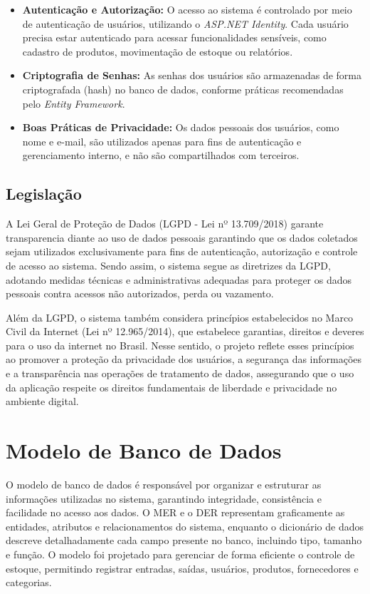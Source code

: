 \documentclass[
	12pt,				%
	openany,			%
	twoside,			%
	a4paper,			%
	english,			%
	brazil				%
	]{abntex2}
\begin{document}
\begin{itemize}
    \item \textbf{Autenticação e Autorização:} O acesso ao sistema é controlado por meio de autenticação de usuários, utilizando o \textit{ASP.NET Identity}. Cada usuário precisa estar autenticado para acessar funcionalidades sensíveis, como cadastro de produtos, movimentação de estoque ou relatórios.

    \item \textbf{Criptografia de Senhas:} As senhas dos usuários são armazenadas de forma criptografada (hash) no banco de dados, conforme práticas recomendadas pelo \textit{Entity Framework}.

    \item \textbf{Boas Práticas de Privacidade:} Os dados pessoais dos usuários, como nome e e-mail, são utilizados apenas para fins de autenticação e gerenciamento interno, e não são compartilhados com terceiros.
\end{itemize}

\subsection{Legislação}

A  Lei Geral de Proteção de Dados (LGPD - Lei nº 13.709/2018) garante transparencia diante ao uso de dados pessoais garantindo que os dados coletados sejam utilizados exclusivamente para fins de autenticação, autorização e controle de acesso ao sistema. Sendo assim, o sistema segue as diretrizes da LGPD, adotando medidas técnicas e administrativas adequadas para proteger os dados pessoais contra acessos não autorizados, perda ou vazamento. 

Além da LGPD, o sistema também considera princípios estabelecidos no Marco Civil da Internet (Lei nº 12.965/2014), que estabelece garantias, direitos e deveres para o uso da internet no Brasil. Nesse sentido, o projeto reflete esses princípios ao promover a proteção da privacidade dos usuários, a segurança das informações e a transparência nas operações de tratamento de dados, assegurando que o uso da aplicação respeite os direitos fundamentais de liberdade e privacidade no ambiente digital.




\section{Modelo de Banco de Dados}

O modelo de banco de dados é responsável por organizar e estruturar as informações utilizadas no sistema, garantindo integridade, consistência e facilidade no acesso aos dados. O MER e o DER representam graficamente as entidades, atributos e relacionamentos do sistema, enquanto o dicionário de dados descreve detalhadamente cada campo presente no banco, incluindo tipo, tamanho e função. O modelo foi projetado para gerenciar de forma eficiente o controle de estoque, permitindo registrar entradas, saídas, usuários, produtos, fornecedores e categorias.
\end{document}
